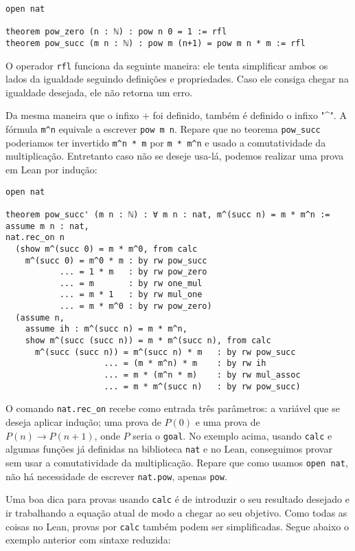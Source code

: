 \begin{lstlisting}
open nat

theorem pow_zero (n : ℕ) : pow n 0 = 1 := rfl
theorem pow_succ (m n : ℕ) : pow m (n+1) = pow m n * m := rfl
\end{lstlisting}

O operador \lstinline{rfl} funciona da seguinte maneira: ele tenta simplificar ambos os lados da igualdade seguindo definições e propriedades. Caso ele consiga chegar na igualdade desejada, ele não retorna um erro.

Da mesma maneira que o infixo $+$ foi definido, também é definido o infixo "\textasciicircum ". A fórmula \lstinline{m^n} equivale a escrever \lstinline{pow m n}. Repare que no teorema \lstinline{pow_succ} poderiamos ter invertido \lstinline{m^n * m} por \lstinline{m * m^n} e usado a comutatividade da multiplicação. Entretanto caso não se deseje usa-lá, podemos realizar uma prova em Lean por indução:

\begin{lstlisting}
open nat

theorem pow_succ' (m n : ℕ) : ∀ m n : nat, m^(succ n) = m * m^n :=
assume m n : nat,
nat.rec_on n 
  (show m^(succ 0) = m * m^0, from calc
    m^(succ 0) = m^0 * m : by rw pow_succ
           ... = 1 * m   : by rw pow_zero
           ... = m       : by rw one_mul
           ... = m * 1   : by rw mul_one
           ... = m * m^0 : by rw pow_zero)
  (assume n,
    assume ih : m^(succ n) = m * m^n,
    show m^(succ (succ n)) = m * m^(succ n), from calc
      m^(succ (succ n)) = m^(succ n) * m   : by rw pow_succ
                    ... = (m * m^n) * m    : by rw ih
                    ... = m * (m^n * m)    : by rw mul_assoc
                    ... = m * m^(succ n)   : by rw pow_succ)
\end{lstlisting}

O comando \lstinline{nat.rec_on} recebe como entrada três parâmetros: a variável que se deseja aplicar indução; uma prova de $P(0)$ e uma prova de $P(n)→P(n+1)$, onde $P$ seria o \lstinline{goal}. No exemplo acima, usando \lstinline{calc} e algumas funções já definidas na biblioteca \lstinline{nat} e no Lean, conseguimos provar sem usar a comutatividade da multiplicação. Repare que como usamos \lstinline{open nat}, não há necessidade de escrever \lstinline{nat.pow}, apenas \lstinline{pow}.

Uma boa dica para provas usando \lstinline{calc} é de introduzir o seu resultado desejado e ir trabalhando a equação atual de modo a chegar ao seu objetivo. Como todas as coisas no Lean, provas por \lstinline{calc} também podem ser simplificadas. Segue abaixo o exemplo anterior com sintaxe reduzida:

